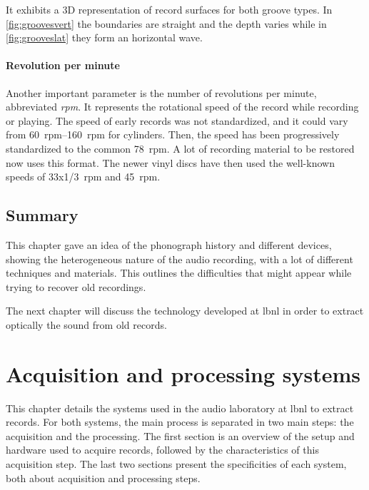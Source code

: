 It exhibits a 3D representation of record surfaces for both groove types. In \autoref{fig:groovesvert} the boundaries are straight and the depth varies while in \autoref{fig:grooveslat} they form an horizontal wave.

\subsubsection{Revolution per minute}

Another important parameter is the number of revolutions per minute, abbreviated \emph{rpm}. It represents the rotational speed of the record while recording or playing. The speed of early records was not standardized, and it could vary from \SIrange[range-units=single]{60}{160}{rpm} for cylinders. Then, the speed has been progressively standardized to the common \SI{78}{rpm}. A lot of recording material to be restored now uses this format. The newer vinyl discs have then used the well-known speeds of \SI[quotient-mode = fraction,fraction-function = \tsfrac,output-product=\hspace{0.5pt},product-units = single]{33x1/3}{rpm} and \SI{45}{rpm}.

\section{Summary}

This chapter gave an idea of the phonograph history and different devices, showing the heterogeneous nature of the audio recording, with a lot of different techniques and materials. This outlines the difficulties that might appear while trying to recover old recordings.

The next chapter will discuss the technology developed at \gls{lbnl} in order to extract optically the sound from old records.

\chapter{Acquisition and processing systems}
\label{chap:acqprocsys}

This chapter details the systems used in the audio laboratory at \gls{lbnl} to extract records. For both systems, the main process is separated in two main steps: the acquisition and the processing. The first section is an overview of the setup and hardware used to acquire records, followed by the characteristics of this acquisition step. The last two sections present the specificities of each system, both about acquisition and processing steps.

